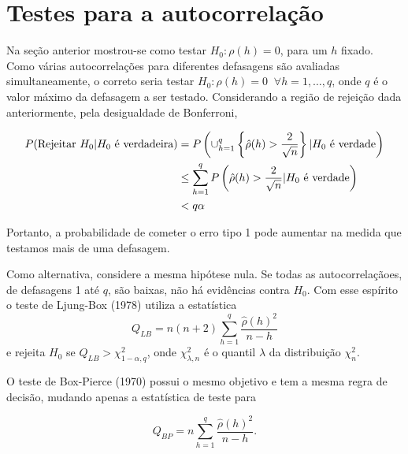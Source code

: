 \documentclass[
  letterpaper,
  DIV=11,
  numbers=noendperiod]{scrreprt}
\theoremstyle{plain}
\theoremstyle{definition}
\theoremstyle{definition}
\theoremstyle{remark}
\begin{document}
\hypertarget{testes-para-a-autocorrelauxe7uxe3o}{%
\section{Testes para a
autocorrelação}\label{testes-para-a-autocorrelauxe7uxe3o}}

Na seção anterior mostrou-se como testar \(H_0:\rho(h)=0\), para um
\(h\) fixado. Como várias autocorrelações para diferentes defasagens são
avaliadas simultaneamente, o correto seria testar
\(H_0: \rho(h)=0\;\;\forall h=1,\ldots,q\), onde \(q\) é o valor máximo
da defasagem a ser testado. Considerando a região de rejeição dada
anteriormente, pela desigualdade de Bonferroni,

\[\begin{align}P(\hbox{Rejeitar }H_0|H_0\hbox{ é verdadeira})&=P\left(\cup_{h=1}^q\left\{ \hat{\rho}(h)>\frac{2}{\sqrt{n}}\right\}| H_0\hbox{ é verdade}\right)\\
&\leq \sum_{h=1}^qP\left( \hat{\rho}(h)>\frac{2}{\sqrt{n}}| H_0\hbox{ é verdade}\right)\\ &<q\alpha\end{align}\]

Portanto, a probabilidade de cometer o erro tipo 1 pode aumentar na
medida que testamos mais de uma defasagem.

Como alternativa, considere a mesma hipótese nula. Se todas as
autocorrelaçãoes, de defasagens 1 até \(q\), são baixas, não há
evidências contra \(H_0\). Com esse espírito o teste de Ljung-Box (1978)
utiliza a estatística
\[Q_{LB}=n(n+2)\sum_{h=1}^q \frac{\hat{\rho}(h)^2}{n-h}\] e rejeita
\(H_0\) se \(Q_{LB}>\chi^2_{1-\alpha,q}\), onde \(\chi^2_{\lambda,n}\) é
o quantil \(\lambda\) da distribuição \(\chi^2_n\).

O teste de Box-Pierce (1970) possui o mesmo objetivo e tem a mesma regra
de decisão, mudando apenas a estatística de teste para

\[Q_{BP}=n\sum_{h=1}^q \frac{\hat{\rho}(h)^2}{n-h}.\]
\end{document}
